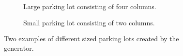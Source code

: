 \begin{figure}[H]
  \centering
  \begin{subfigure}[b]{0.485\textwidth}
    \caption{Large parking lot consisting of four columns.}
  \end{subfigure}
  \quad
  \begin{subfigure}[b]{0.45\textwidth}
    \caption{Small parking lot consisting of two columns.}
  \end{subfigure}
    \caption{Two examples of different sized parking lots created by the generator.}
  \label{fig:sizebased}
\end{figure}
